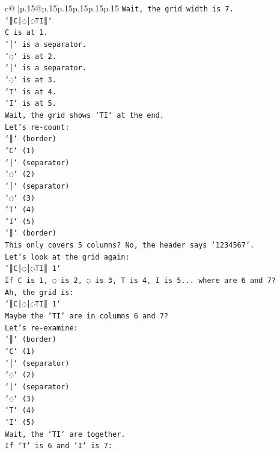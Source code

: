 \documentclass{article}
\begin{document}
{\begin{supertabular}{c@{$\;$}|p{.15\linewidth}@{}p{.15\linewidth}p{.15\linewidth}p{.15\linewidth}p{.15\linewidth}p{.15\linewidth}}
{{{\texttt{Wait, the grid width is 7.} \\
\texttt{`║C│◌│◌TI║`} \\
\texttt{C is at 1.} \\
\texttt{`│` is a separator.} \\
\texttt{`◌` is at 2.} \\
\texttt{`│` is a separator.} \\
\texttt{`◌` is at 3.} \\
\texttt{`T` is at 4.} \\
\texttt{`I` is at 5.} \\
\texttt{Wait, the grid shows `TI` at the end.} \\
\texttt{Let's re{-}count:} \\
\texttt{`║` (border)} \\
\texttt{`C` (1)} \\
\texttt{`│` (separator)} \\
\texttt{`◌` (2)} \\
\texttt{`│` (separator)} \\
\texttt{`◌` (3)} \\
\texttt{`T` (4)} \\
\texttt{`I` (5)} \\
\texttt{`║` (border)} \\
\texttt{This only covers 5 columns? No, the header says `1234567`.} \\
\texttt{Let's look at the grid again:} \\
\texttt{`║C│◌│◌TI║ 1`} \\
\texttt{If C is 1, ◌ is 2, ◌ is 3, T is 4, I is 5... where are 6 and 7?} \\
\texttt{Ah, the grid is:} \\
\texttt{`║C│◌│◌TI║ 1`} \\
\texttt{Maybe the `TI` are in columns 6 and 7?} \\
\texttt{Let's re{-}examine:} \\
\texttt{`║` (border)} \\
\texttt{`C` (1)} \\
\texttt{`│` (separator)} \\
\texttt{`◌` (2)} \\
\texttt{`│` (separator)} \\
\texttt{`◌` (3)} \\
\texttt{`T` (4)} \\
\texttt{`I` (5)} \\
\texttt{Wait, the `TI` are together.} \\
\texttt{If `T` is 6 and `I` is 7:} \\
}}}
\end{supertabular}}
\end{document}
